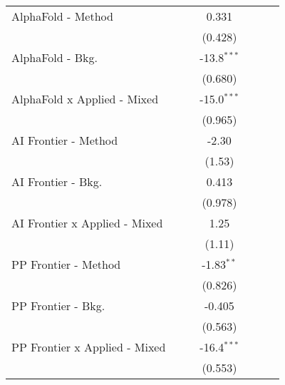 \begin{tabular}{lcccccc}
   AlphaFold - Method             &          &              & 0.331         &                &        &   \\   
                                  &          &              & (0.428)       &                &        &   \\   
   AlphaFold - Bkg.               &          &              & -13.8$^{***}$ &                &        &   \\   
                                  &          &              & (0.680)       &                &        &   \\   
   AlphaFold x Applied - Mixed    &          &              & -15.0$^{***}$ &                &        &   \\   
                                  &          &              & (0.965)       &                &        &   \\   
   AI Frontier - Method           &          &              & -2.30         &                &        &   \\   
                                  &          &              & (1.53)        &                &        &   \\   
   AI Frontier - Bkg.             &          &              & 0.413         &                &        &   \\   
                                  &          &              & (0.978)       &                &        &   \\   
   AI Frontier x Applied - Mixed  &          &              & 1.25          &                &        &   \\   
                                  &          &              & (1.11)        &                &        &   \\   
   PP Frontier - Method           &          &              & -1.83$^{**}$  &                &        &   \\   
                                  &          &              & (0.826)       &                &        &   \\   
   PP Frontier - Bkg.             &          &              & -0.405        &                &        &   \\   
                                  &          &              & (0.563)       &                &        &   \\   
   PP Frontier x Applied - Mixed  &          &              & -16.4$^{***}$ &                &        &   \\   
                                  &          &              & (0.553)       &                &        &   \\   

\end{tabular}
